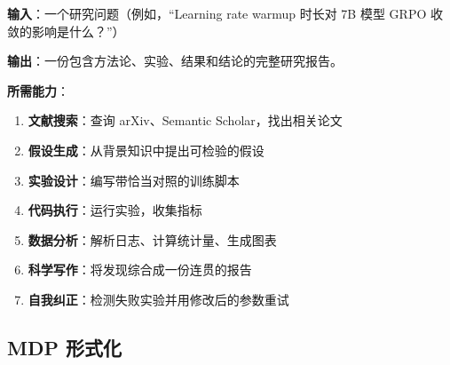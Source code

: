 \begin{keybox}[研究 Agent 需求]
\textbf{输入}：一个研究问题（例如，``Learning rate warmup 时长对 7B 模型 GRPO 收敛的影响是什么？''）

\textbf{输出}：一份包含方法论、实验、结果和结论的完整研究报告。

\textbf{所需能力}：

\begin{enumerate}
  \item \textbf{文献搜索}：查询 arXiv、Semantic Scholar，找出相关论文
  \item \textbf{假设生成}：从背景知识中提出可检验的假设
  \item \textbf{实验设计}：编写带恰当对照的训练脚本
  \item \textbf{代码执行}：运行实验，收集指标
  \item \textbf{数据分析}：解析日志、计算统计量、生成图表
  \item \textbf{科学写作}：将发现综合成一份连贯的报告
  \item \textbf{自我纠正}：检测失败实验并用修改后的参数重试
\end{enumerate}
\end{keybox}

\subsection{MDP 形式化}
\label{mdp-formulation}

